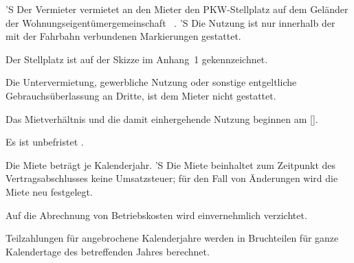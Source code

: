 \documentclass[fontsize=11pt,a4paper,parskip=half]{scrreprt}
\begin{document}
\appendix

\begin{contract}



'S Der Vermieter vermietet an den Mieter den PKW-Stellplatz \ContractObject auf dem Geländer der Wohnungseigentümergemeinschaft \LandlordAddressStreet~\LandlordAddressHouseNo.
'S Die Nutzung ist nur innerhalb der mit der Fahrbahn verbundenen Markierungen
gestattet.

Der Stellplatz ist auf der Skizze im Anhang~1 gekennzeichnet.


Die Untervermietung, gewerbliche Nutzung oder sonstige entgeltliche Gebrauchsüberlassung an Dritte, ist dem Mieter nicht gestattet.

\newpage


Das Mietverhältnis und die damit einhergehende Nutzung beginnen am [\ContractBegin]. 

Es ist
	unbefristet
. 


Die Miete beträgt \EUR{\ContractPrice{}} je Kalenderjahr.
'S Die Miete beinhaltet zum Zeitpunkt des Vertragsabschlusses keine Umsatzsteuer; für den Fall von Änderungen wird die Miete neu festgelegt.

Auf die Abrechnung von Betriebskosten wird einvernehmlich verzichtet.

Teilzahlungen für angebrochene Kalenderjahre werden in Bruchteilen für ganze Kalendertage des betreffenden Jahres berechnet.


\end{contract}
\end{document}
